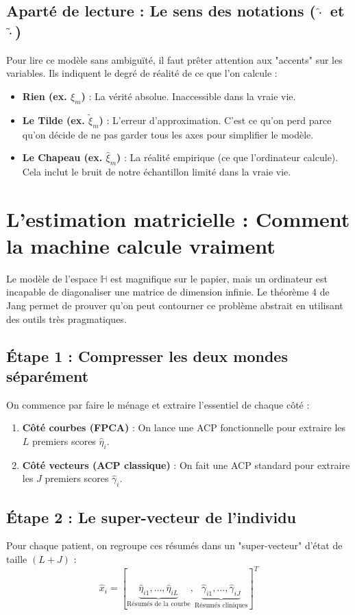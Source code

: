 \documentclass[11pt, a4paper]{article}
\begin{document}
\subsection*{Aparté de lecture : Le sens des notations ($\hat{\cdot}$ et $\tilde{\cdot}$)}
Pour lire ce modèle sans ambiguïté, il faut prêter attention aux "accents" sur les variables. Ils indiquent le degré de réalité de ce que l'on calcule :
\begin{itemize}
    \item \textbf{Rien (ex. $\xi_m$)} : La vérité absolue. Inaccessible dans la vraie vie.
    \item \textbf{Le Tilde (ex. $\tilde{\xi}_m$)} : L'erreur d'approximation. C'est ce qu'on perd parce qu'on décide de ne pas garder tous les axes pour simplifier le modèle.
    \item \textbf{Le Chapeau (ex. $\hat{\xi}_m$)} : La réalité empirique (ce que l'ordinateur calcule). Cela inclut le bruit de notre échantillon limité dans la vraie vie.
\end{itemize}


\section{L'estimation matricielle : Comment la machine calcule vraiment}

Le modèle de l'espace $\mathbb{H}$ est magnifique sur le papier, mais un ordinateur est incapable de diagonaliser une matrice de dimension infinie. Le théorème 4 de Jang permet de prouver qu'on peut contourner ce problème abstrait en utilisant des outils très pragmatiques.

\subsection{Étape 1 : Compresser les deux mondes séparément}
On commence par faire le ménage et extraire l'essentiel de chaque côté :
\begin{enumerate}
    \item \textbf{Côté courbes (FPCA)} : On lance une ACP fonctionnelle pour extraire les $L$ premiers scores $\hat{\eta}_{i}$.
    \item \textbf{Côté vecteurs (ACP classique)} : On fait une ACP standard pour extraire les $J$ premiers scores $\hat{\gamma}_{i}$.
\end{enumerate}

\subsection{Étape 2 : Le super-vecteur de l'individu}
Pour chaque patient, on regroupe ces résumés dans un "super-vecteur" d'état de taille $(L+J)$ :
\begin{equation}
\hat{x}_i = [\underbrace{\hat{\eta}_{i1}, \dots, \hat{\eta}_{iL}}_{\text{Résumés de la courbe}}, \underbrace{\hat{\gamma}_{i1}, \dots, \hat{\gamma}_{iJ}}_{\text{Résumés cliniques}}]^T
\end{equation}
\end{document}
